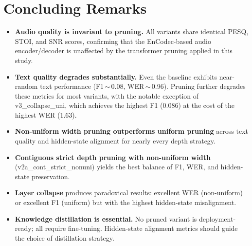 \documentclass[11pt,a4paper]{article}
\begin{document}
\newpage
\section{Concluding Remarks}

\begin{itemize}[leftmargin=1.5em]
  \item \textbf{Audio quality is invariant to pruning.} All variants share identical PESQ, STOI, and SNR scores, confirming that the EnCodec-based audio encoder/decoder is unaffected by the transformer pruning applied in this study.
  \item \textbf{Text quality degrades substantially.} Even the baseline exhibits near-random text performance (F1\,$\sim$\,0.08, WER\,$\sim$\,0.96). Pruning further degrades these metrics for most variants, with the notable exception of v3\_collapse\_uni, which achieves the highest F1 (0.086) at the cost of the highest WER (1.63).
  \item \textbf{Non-uniform width pruning outperforms uniform pruning} across text quality and hidden-state alignment for nearly every depth strategy.
  \item \textbf{Contiguous strict depth pruning with non-uniform width} (v2a\_cont\_strict\_nonuni) yields the best balance of F1, WER, and hidden-state preservation.
  \item \textbf{Layer collapse} produces paradoxical results: excellent WER (non-uniform) or excellent F1 (uniform) but with the highest hidden-state misalignment.
  \item \textbf{Knowledge distillation is essential.} No pruned variant is deployment-ready; all require fine-tuning. Hidden-state alignment metrics should guide the choice of distillation strategy.
\end{itemize}
\end{document}

